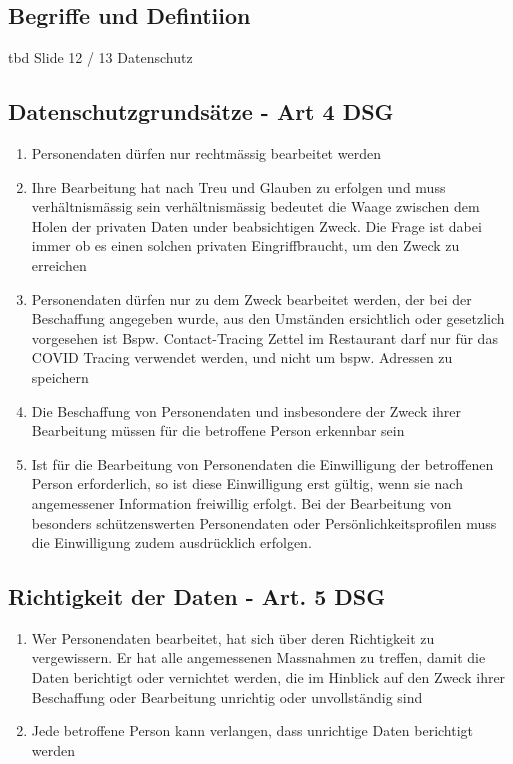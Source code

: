 \documentclass{report}
\theoremstyle{definition}
\theoremstyle{example}
\begin{document}
\subsection{Begriffe und Defintiion}
tbd Slide 12 / 13 Datenschutz

\subsection{Datenschutzgrundsätze - Art 4 DSG}
\begin{enumerate}
   \item Personendaten dürfen nur rechtmässig bearbeitet werden
   \item Ihre Bearbeitung hat nach Treu und Glauben zu erfolgen und muss verhältnismässig sein
   \subitem verhältnismässig bedeutet die Waage zwischen dem Holen der privaten Daten under beabsichtigen Zweck. Die Frage ist dabei immer ob es einen solchen privaten Eingriffbraucht, um den Zweck zu erreichen 
   \item Personendaten dürfen nur zu dem Zweck bearbeitet werden, der bei der Beschaffung angegeben wurde, aus den Umständen ersichtlich oder gesetzlich vorgesehen ist
   \subitem Bspw. Contact-Tracing Zettel im Restaurant darf nur für das COVID Tracing verwendet werden, und nicht um bspw. Adressen zu speichern 
   \item Die Beschaffung von Personendaten und insbesondere der Zweck ihrer Bearbeitung müssen für die betroffene Person erkennbar sein
   \item Ist für die Bearbeitung von Personendaten die Einwilligung der betroffenen Person erforderlich, so ist diese Einwilligung erst gültig, wenn sie nach angemessener Information freiwillig erfolgt. Bei der Bearbeitung von besonders schützenswerten Personendaten oder Persönlichkeitsprofilen muss die Einwilligung zudem ausdrücklich erfolgen.
\end{enumerate}

\subsection{Richtigkeit der Daten - Art. 5 DSG}
\begin{enumerate}
   \item Wer Personendaten bearbeitet, hat sich über deren Richtigkeit zu vergewissern. Er hat alle angemessenen Massnahmen zu treffen, damit die Daten berichtigt oder vernichtet werden, die im Hinblick auf den Zweck ihrer Beschaffung oder Bearbeitung unrichtig oder unvollständig sind
   \item Jede betroffene Person kann verlangen, dass unrichtige Daten berichtigt werden
\end{enumerate}
\end{document}
